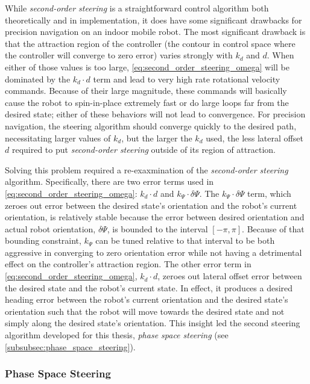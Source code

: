 While \emph{second-order steering} is a straightforward control algorithm both theoretically and in implementation, it does have some significant drawbacks for precision navigation on an indoor mobile robot. The most significant drawback is that the attraction region  of the controller (the contour in control space where the controller will converge to zero error) varies strongly with $k_d$ and $d$. When either of those values is too large, \eqref{eq:second_order_steering_omega} will be dominated by the $k_d \cdot d$ term and lead to very high rate rotational velocity commands. Because of their large magnitude, these commands will basically cause the robot to spin-in-place extremely fast or do large loops far from the desired state; either of these behaviors will not lead to convergence. For precision navigation, the steering algorithm should converge quickly to the desired path, necessitating larger values of $k_d$, but the larger the $k_d$ used, the less lateral offset $d$ required to put \emph{second-order steering} outside of its region of attraction.

Solving this problem required a re-exaxmination of the \emph{second-order steering} algorithm. Specifically, there are two error terms used in \eqref{eq:second_order_steering_omega}: $k_d \cdot d$ and $k_{\Psi} \cdot \delta\Psi$. The $k_{\Psi} \cdot \delta\Psi$ term, which zeroes out error between the desired state's orientation and the robot's current orientation, is relatively stable because the error between desired orientation and actual robot orientation, $\delta\Psi$, is bounded to the interval $\left[-\pi,\pi\right]$. Because of that bounding constraint, $k_{\Psi}$ can be tuned relative to that interval to be both aggressive in converging to zero orientation error while not having a detrimental effect on the controller's attraction region. The other error term in \eqref{eq:second_order_steering_omega}, $k_d \cdot d$, zeroes out lateral offset error between the desired state and the robot's current state. In effect, it produces a desired heading error between the robot's current orientation and the desired state's orientation such that the robot will move towards the desired state and not simply along the desired state's orientation. This insight led the second steering algorithm developed for this thesis, \emph{phase space steering} (see \autoref{subsubsec:phase_space_steering}).

\subsubsection{Phase Space Steering}\label{subsubsec:phase_space_steering}

